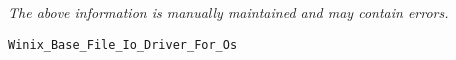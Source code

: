 \label{pkg:winix\_base\_data\_file\_io\_driver\_for\_posix}

{\tiny \it The above information is manually maintained and may contain errors.}
\begin{verbatim}
Winix_Base_File_Io_Driver_For_Os
\end{verbatim}

